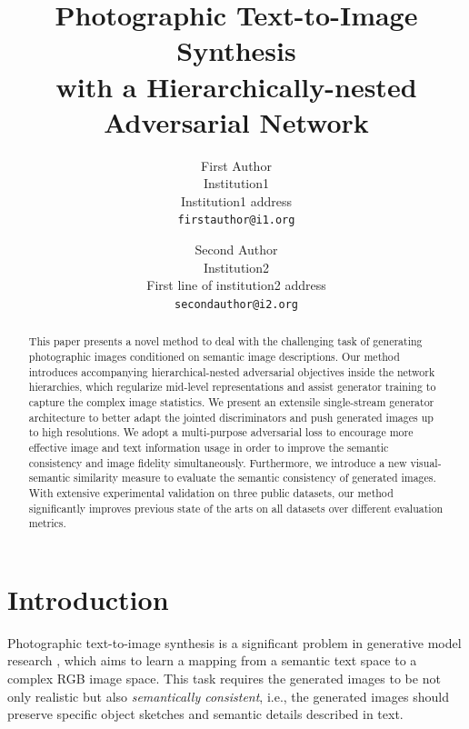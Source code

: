 \documentclass[10pt,twocolumn,letterpaper]{article}
\begin{document}
\title{Photographic Text-to-Image Synthesis \\ with a Hierarchically-nested Adversarial Network}

\author{First Author\\
Institution1\\
Institution1 address\\
{\tt\small firstauthor@i1.org}
\and
Second Author\\
Institution2\\
First line of institution2 address\\
{\tt\small secondauthor@i2.org}
}

\maketitle

\begin{abstract}
This paper presents a novel method to deal with the challenging task of generating photographic images conditioned on semantic image descriptions.
Our method introduces accompanying hierarchical-nested adversarial objectives inside the network hierarchies, which regularize mid-level representations and assist generator training to capture the complex image statistics. We present an extensile single-stream generator architecture to better adapt the jointed discriminators and push generated images up to high resolutions. We adopt a multi-purpose adversarial loss to encourage more effective image and text information usage in order to improve the semantic consistency and image fidelity simultaneously. Furthermore, we introduce a new visual-semantic similarity measure to evaluate the semantic consistency of generated images. With extensive experimental validation on three public datasets, our method significantly improves previous state of the arts on all datasets over different evaluation metrics. 


\end{abstract}

\section{Introduction}
Photographic text-to-image synthesis is a significant problem in generative model research \cite{reed2016generative}, which aims to learn a mapping from a semantic text space to a complex RGB image space. This task requires the generated images to be not only realistic but also \textit{semantically consistent}, i.e., the generated images should preserve specific object sketches and semantic details described in text.
\end{document}
